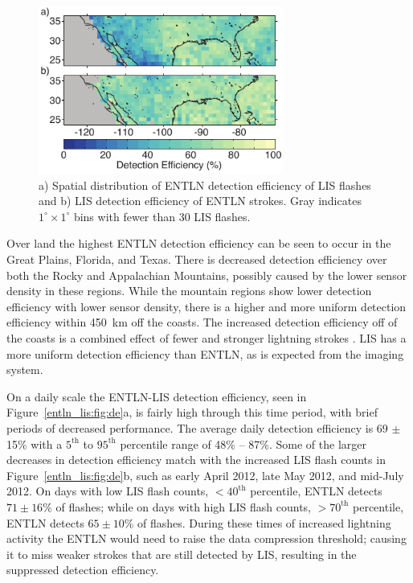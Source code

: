 \begin{figure}[t]
   \centering
   \noindent\includegraphics[width=19pc,angle=0]{entln_lis/Figures/map.pdf}
   \caption{a) Spatial distribution of ENTLN detection efficiency of LIS flashes and
   		b) LIS detection efficiency of ENTLN strokes.
   		Gray indicates $1^\circ \times 1^\circ$ bins with fewer than 30 LIS flashes.
		}
   \label{entln_lis:fig:map}
\end{figure}

Over land the highest ENTLN detection efficiency can be seen to occur in the Great Plains, Florida, and Texas.
There is decreased detection efficiency over both the Rocky and Appalachian Mountains, possibly caused by the lower sensor density in these regions.
While the mountain regions show lower detection efficiency with lower sensor density, there is a higher and more uniform detection efficiency within 450~km off the coasts.
The increased detection efficiency off of the coasts is a combined effect of fewer and stronger lightning strokes \citep{Hutchins2013, Rudlosky2010}.
LIS has a more uniform detection efficiency than ENTLN, as is expected from the imaging system.

On a daily scale the ENTLN-LIS detection efficiency, seen in Figure~\ref{entln_lis:fig:de}a, is fairly high through this time period, with brief periods of decreased performance.
The average daily detection efficiency is 69 $\pm$ 15\% with a $5^\text{th}$ to $95^\text{th}$ percentile range of 48\% -- 87\%.
Some of the larger decreases in detection efficiency match with the increased LIS flash counts in Figure~\ref{entln_lis:fig:de}b, such as early April 2012, late May 2012, and mid-July 2012.
On days with low LIS flash counts, $<40^\text{th}$ percentile, ENTLN detects $71\pm16$\% of flashes; while on days with high LIS flash counts, $>70^\text{th}$ percentile, ENTLN detects $65\pm10$\% of flashes.
During these times of increased lightning activity the ENTLN would need to raise the data compression threshold; causing it to miss weaker strokes that are still detected by LIS, resulting in the suppressed detection efficiency.

